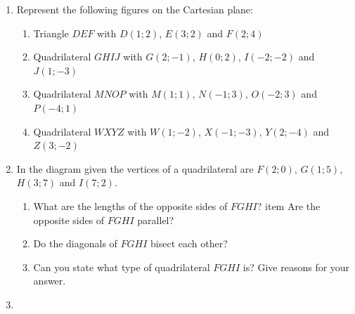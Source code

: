 \begin{eocexercises}{}
\begin{enumerate}[noitemsep, label=\textbf{\arabic*}. ] 
\item 
Represent the following figures on the Cartesian plane: 
\begin{enumerate}[noitemsep, label=\textbf{\alph*}. ] 
\item Triangle $DEF$ with $D(1;2)$, $E(3;2)$ and $F(2;4)$ 
\item Quadrilateral $GHIJ$ with $G(2;-1)$, $H(0;2)$, $I(-2;-2)$ and $J(1;-3)$
\item Quadrilateral $MNOP$ with $M(1;1)$, $N(-1;3)$, $O(-2;3)$ and $P(-4;1)$ 
\item Quadrilateral $WXYZ$ with $W(1;-2)$, $X(-1;-3)$, $Y(2;-4)$ and $Z(3;-2)$
\end{enumerate}
\item 
In the diagram given the vertices of a quadrilateral are $F(2;0)$, $G(1;5)$, $H(3;7)$ and $I(7;2)$.
\setcounter{subfigure}{0}
\begin{figure}[H] %
\begin{center}
\end{center}
\end{figure}  
\begin{enumerate}[noitemsep, label=\textbf{\alph*}. ] 
\item 
What are the lengths of the opposite sides of $FGHI$?
item Are the opposite sides of $FGHI$ parallel?
\item  Do the diagonals of $FGHI$ bisect each other?
\item  Can you state what type of quadrilateral $FGHI$ is? Give reasons for your answer.
\end{enumerate}
\item 

\end{enumerate}
\end{eocexercises}
